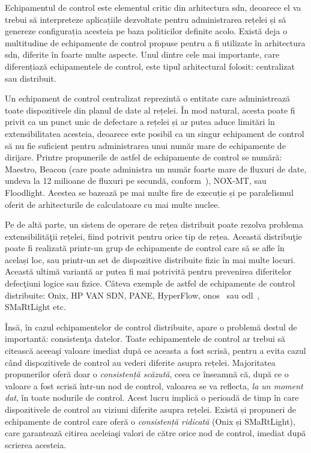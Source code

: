 Echipamentul de control este elementul critic din arhitectura \gls{sdn}, deoarece el va trebui să interpreteze aplicațiile dezvoltate pentru administrarea rețelei și să genereze configurația acesteia pe baza politicilor definite acolo. Există deja o multitudine de echipamente de control propuse pentru a fi utilizate în arhitectura \gls{sdn}, diferite în foarte multe aspecte. Unul dintre cele mai importante, care diferențiază echipamentele de control, este tipul arhitectural folosit: centralizat sau distribuit.

Un echipament de control centralizat reprezintă o entitate care administrează toate dispozitivele din planul de date al rețelei. În mod natural, acesta poate fi privit ca un punct unic de defectare a rețelei și ar putea aduce limitări în extensibilitatea acesteia, deoarece este posibil ca un singur echipament de control să nu fie suficient pentru administrarea unui număr mare de echipamente de dirijare. Printre propunerile de astfel de echipamente de control se numără: Maestro, Beacon (care poate administra un număr foarte mare de fluxuri de date, undeva la 12 milioane de fluxuri pe secundă, conform~\cite{erickson2013beacon}), NOX-MT, sau Floodlight. Acestea se bazează pe mai multe fire de execuție și pe paralelismul oferit de arhitecturile de calculatoare cu mai multe nuclee.

Pe de altă parte, un sistem de operare de rețea distribuit poate rezolva problema extensibilităţii rețelei, fiind potrivit pentru orice tip de rețea. Această distribuţie poate fi realizată printr-un grup de echipamente de control care să se afle în același loc, sau printr-un set de dispozitive distribuite fizic în mai multe locuri. Această ultimă variantă ar putea fi mai potrivită pentru prevenirea diferitelor defecţiuni logice sau fizice. Câteva exemple de astfel de echipamente de control distribuite: Onix, HP VAN SDN, PANE, HyperFlow, \gls{onos}~\cite{berde2014onos} sau \gls{odl}~\cite{medved2014opendaylight}, SMaRtLight etc.

Însă, în cazul echipamentelor de control distribuite, apare o problemă destul de importantă: consistenţa datelor. Toate echipamentele de control ar trebui să citească aceeaşi valoare imediat după ce aceasta a fost scrisă, pentru a evita cazul când dispozitivele de control au vederi diferite asupra rețelei. Majoritatea propunerilor oferă doar o \textit{consistență scăzută}, ceea ce înseamnă că, după ce o valoare a fost scrisă într-un nod de control, valoarea se va reflecta, \textit{la un moment dat}, în toate nodurile de control. Acest lucru implică o perioadă de timp în care dispozitivele de control au viziuni diferite asupra rețelei. Există și propuneri de echipamente de control care oferă o \textit{consistență ridicată} (Onix și SMaRtLight), care garantează citirea aceleiaşi valori de către orice nod de control, imediat după scrierea acesteia.

